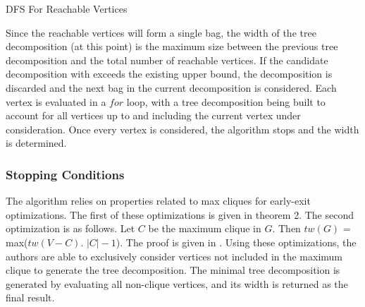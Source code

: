\documentclass[12pt,conference]{IEEEtran}
\theoremstyle{plain}
\begin{document}
\begin{algorithm}[t]
  \caption{DFS For Reachable Vertices}
  \label{dfs_reachable_v}
  \begin{algorithmic}[1]
    \Else
    \EndIf
  \EndProcedure
  \State{}
      \EndIf
    \EndFor
      \Else
      \EndIf
    \Else
    \EndIf
  \EndWhile
  \EndProcedure
  \end{algorithmic}
\end{algorithm}

Since the reachable vertices will form a single bag, the width of the tree decomposition (at this point) is the maximum size between the previous tree decomposition and the total number of reachable vertices. If the candidate decomposition with exceeds the existing upper bound, the decomposition is discarded and the next bag in the current decomposition is considered. Each vertex is evaluated in a $for$ loop, with a tree decomposition being built to account for all vertices up to and including the current vertex under consideration. Once every vertex is considered, the algorithm stops and the width is determined. 

\subsubsection{Stopping Conditions}

The algorithm relies on properties related to max cliques for early-exit optimizations. The first of these optimizations is given in theorem 2. The second optimization is as follows. Let $C$ be the maximum clique in $G$. Then $tw(G)$ = max($tw(V-C)$. $|C|-1$). The proof is given in \cite{bodlaender-2012}. Using these optimizations, the authors are able to exclusively consider vertices not included in the maximum clique to generate the tree decomposition. The minimal tree decomposition is generated by evaluating all non-clique vertices, and its width is returned as the final result.
\end{document}
